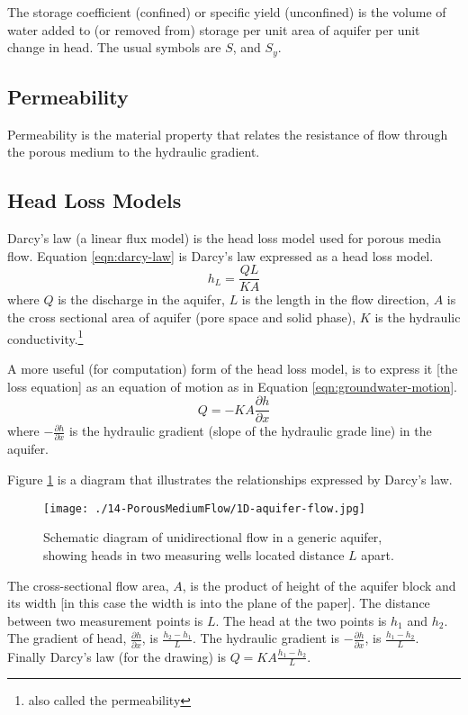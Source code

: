 The storage coefficient (confined) or specific yield (unconfined) is the volume of water added to (or removed from) storage per unit area of aquifer per unit change in head.  The usual symbols are $S$, and $S_y$.


\subsection{Permeability}
Permeability is the material property that relates the resistance of flow through the porous medium to the hydraulic gradient.

\subsection{Head Loss Models}
Darcy's law (a linear flux model) is the head loss model used for porous media flow.   
Equation \ref{eqn:darcy-law} is Darcy's law expressed as a head loss model.
\begin{equation}
h_L = \frac{QL}{KA}
\label{eqn:darcy-law}
\end{equation}
where $Q$ is the discharge in the aquifer, $L$ is the length in the flow direction, $A$ is the cross sectional area of aquifer (pore space and solid phase), $K$ is the hydraulic conductivity.\footnote{also called the permeability}

A more useful (for computation) form of the head loss model, is to express it [the loss equation] as an equation of motion as in Equation \ref{eqn:groundwater-motion}.
\begin{equation}
Q = -KA\frac{\partial h}{\partial x}
\label{eqn:groundwater-motion}
\end{equation}
where $- \frac{\partial h}{\partial x}$ is the hydraulic gradient (slope of the hydraulic grade line) in the aquifer.

Figure \ref{fig:1D-aquifer-flow} is a diagram that illustrates the relationships expressed by Darcy's law.  

\begin{figure}[h!] %
   \centering
   \texttt{[image: ./14-PorousMediumFlow/1D-aquifer-flow.jpg]} 
   \caption{Schematic diagram of unidirectional flow in a generic aquifer, showing heads in two measuring wells located distance $L$ apart.}
   \label{fig:1D-aquifer-flow}
\end{figure}

The cross-sectional flow area, $A$, is the product of height of the aquifer block and its width [in this case the width is into the plane of the paper].
The distance between two measurement points is $L$.
The head at the two points is $h_1$ and $h_2$.
The gradient of head, $\frac{\partial h}{\partial x}$, is $\frac{h_2 - h_1}{L}$.
The hydraulic gradient is  $- \frac{\partial h}{\partial x}$, is $\frac{h_1 - h_2}{L}$.
Finally Darcy's law (for the drawing) is $Q = K A \frac{h_1 - h_2}{L}$.

